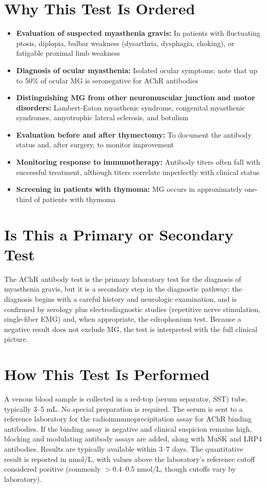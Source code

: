 \section*{Why This Test Is Ordered}
\begin{itemize}
  \item \textbf{Evaluation of suspected myasthenia gravis:} In patients with fluctuating ptosis, diplopia, bulbar weakness (dysarthria, dysphagia, choking), or fatigable proximal limb weakness
  \item \textbf{Diagnosis of ocular myasthenia:} Isolated ocular symptoms; note that up to 50\% of ocular MG is seronegative for AChR antibodies
  \item \textbf{Distinguishing MG from other neuromuscular junction and motor disorders:} Lambert-Eaton myasthenic syndrome, congenital myasthenic syndromes, amyotrophic lateral sclerosis, and botulism
  \item \textbf{Evaluation before and after thymectomy:} To document the antibody status and, after surgery, to monitor improvement
  \item \textbf{Monitoring response to immunotherapy:} Antibody titers often fall with successful treatment, although titers correlate imperfectly with clinical status
  \item \textbf{Screening in patients with thymoma:} MG occurs in approximately one-third of patients with thymoma
\end{itemize}

\section*{Is This a Primary or Secondary Test}
The AChR antibody test is the primary laboratory test for the diagnosis of myasthenia gravis, but it is a secondary step in the diagnostic pathway: the diagnosis begins with a careful history and neurologic examination, and is confirmed by serology plus electrodiagnostic studies (repetitive nerve stimulation, single-fiber EMG) and, when appropriate, the edrophonium test. Because a negative result does not exclude MG, the test is interpreted with the full clinical picture.

\section*{How This Test Is Performed}
A venous blood sample is collected in a red-top (serum separator, SST) tube, typically 3--5 mL. No special preparation is required. The serum is sent to a reference laboratory for the radioimmunoprecipitation assay for AChR binding antibodies. If the binding assay is negative and clinical suspicion remains high, blocking and modulating antibody assays are added, along with MuSK and LRP4 antibodies. Results are typically available within 3--7 days. The quantitative result is reported in nmol/L, with values above the laboratory's reference cutoff considered positive (commonly $>$0.4--0.5 nmol/L, though cutoffs vary by laboratory).

